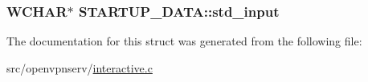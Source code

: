 \subsubsection[{std\+\_\+input}]{\setlength{\rightskip}{0pt plus 5cm}W\+C\+H\+A\+R$\ast$ S\+T\+A\+R\+T\+U\+P\+\_\+\+D\+A\+T\+A\+::std\+\_\+input}\label{struct_s_t_a_r_t_u_p___d_a_t_a_ab5cb3f2722e767ee2e59637ae0fee16f}


The documentation for this struct was generated from the following file\+:\begin{DoxyCompactItemize}
\item 
src/openvpnserv/\hyperlink{interactive_8c}{interactive.\+c}\end{DoxyCompactItemize}

